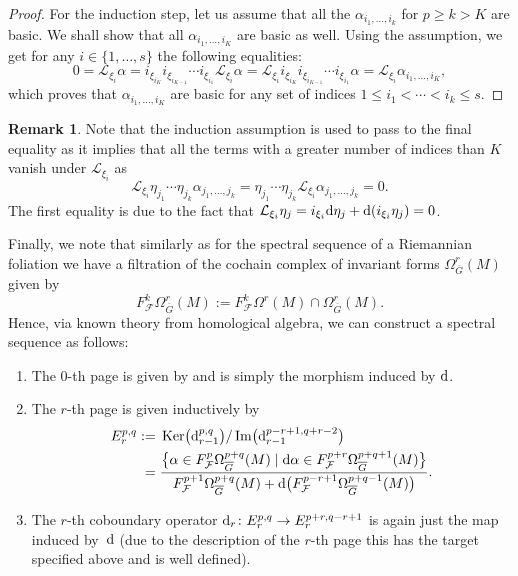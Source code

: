 \documentclass[10pt,a4paper]{amsart}
\numberwithin{equation}{section}
\theoremstyle{definition}
\newtheorem{rem}[tw]{Remark}
\begin{document}
\begin{proof}
For the induction step, let us assume that all the $\alpha_{i_1,\dots,i_{k}}$ for $p\geq k>K$ are basic. We shall show that all $\alpha_{i_1,\dots,i_{K}}$ are basic as well. Using the assumption, we get for any $i\in\{1,\dots,s\}$ the following equalities:
\[0=\mathcal{L}_{\xi_i}\alpha=i_{\xi_{i_K}}i_{\xi_{i_{K-1}}}\cdots i_{\xi_{i_1}}\mathcal{L}_{\xi_i}\alpha=\mathcal{L}_{\xi_i}i_{\xi_{i_K}}i_{\xi_{i_{K-1}}}\cdots i_{\xi_{i_1}}\alpha=\mathcal{L}_{\xi_i}\alpha_{i_1,\dots,i_K},\]
which proves that $\alpha_{i_1,\dots,i_K}$ are basic for any set of indices $1\leq i_1<\cdots <i_k\leq s$.
\end{proof}

\begin{rem} Note that the induction assumption is used to pass to the final equality as it implies that all the terms with a greater number of indices than $K$ vanish under $\mathcal{L}_{\xi_i}$ as
\[\mathcal{L}_{\xi_i}\eta_{j_1}\cdots \eta_{j_k}\alpha_{j_1,\dots,j_k}=\eta_{j_1}\cdots \eta_{j_k}\mathcal{L}_{\xi_i}\alpha_{j_1,\dots,j_k}=0.\]
The first equality is due to the fact that $\mathcal{L}_{\xi_i}\eta_j=i_{\xi_i}{\rm d}\eta_j+{\rm d}(i_{\xi_i}\eta_j)=0$.
\end{rem}
Finally, we note that similarly as for the spectral sequence of a Riemannian foliation we have a filtration of the cochain complex of invariant forms $\Omega^r_{\overline{G}}(M)$ given by
\[F^k_{\mathcal{F}}\Omega^r_{\overline{G}}(M):=F^k_{\mathcal{F}}\Omega^r(M)\cap\Omega^r_{\overline{G}}(M).\]
Hence, via known theory from homological algebra, we can construct a spectral sequence as follows:
\begin{enumerate}\itemsep=0pt
\item The $0$-th page is given by  and  is simply the morphism induced by ${\rm d}$.
\item The $r$-th page is given inductively by
\begin{align*}
E_{r}^{p,q}:={}&\operatorname{Ker}\bigl({\rm d}^{p,q}_{r-1}\bigr)\slash \operatorname{Im}\bigl({\rm d}^{p-r+1,q+r-2}_{r-1}\bigr)\\
={}&\frac{\bigl\{\alpha\in F^{p}_{\mathcal{F}}\Omega^{p+q}_{\overline{G}}(M)\mid {\rm d}\alpha\in F_{\mathcal{F}}^{p+r}\Omega^{p+q+1}_{\overline{G}}(M)\bigr\}}{F^{p+1}_{\mathcal{F}} \Omega^{p+q}_{\overline{G}}(M)+{\rm d}\bigl(F_{\mathcal{F}}^{p-r+1}\Omega_{\overline{G}}^{p+q-1}(M)\bigr)}.
\end{align*}
\item The $r$-th coboundary operator ${\rm d}_r\colon E_r^{p,q}\to E^{p+r,q-r+1}_r$ is again just the map induced by~${\rm d}$ (due to the description of the $r$-th page this has the target specified above and is well defined).
\end{enumerate}
\end{document}
